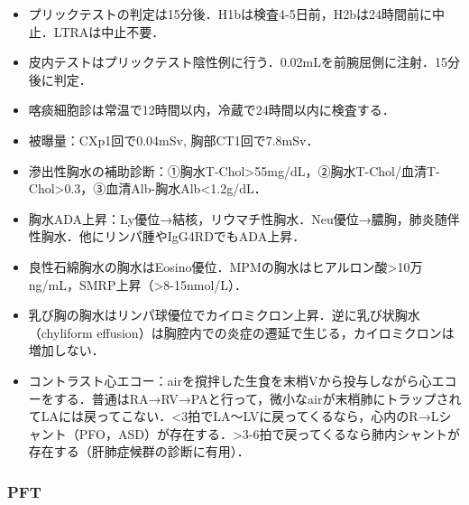 \begin{itemize}
\item プリックテストの判定は15分後．H1bは検査4-5日前，H2bは24時間前に中止．LTRAは中止不要．
\item 皮内テストはプリックテスト陰性例に行う．0.02mLを前腕屈側に注射．15分後に判定．
\item 喀痰細胞診は常温で12時間以内，冷蔵で24時間以内に検査する．
\item 被曝量：CXp1回で0.04mSv, 胸部CT1回で7.8mSv．
\item 滲出性胸水の補助診断：①胸水T-Chol>55mg/dL，②胸水T-Chol/血清T-Chol>0.3，③血清Alb-胸水Alb<1.2g/dL．
\item 胸水ADA上昇：Ly優位→結核，リウマチ性胸水．Neu優位→膿胸，肺炎随伴性胸水．他にリンパ腫やIgG4RDでもADA上昇．
\item 良性石綿胸水の胸水はEosino優位．MPMの胸水はヒアルロン酸>10万ng/mL，SMRP上昇（>8-15nmol/L）．
\item 乳び胸の胸水はリンパ球優位でカイロミクロン上昇．逆に乳び状胸水（chyliform effusion）は胸腔内での炎症の遷延で生じる，カイロミクロンは増加しない．
\item コントラスト心エコー：airを撹拌した生食を末梢Vから投与しながら心エコーをする．普通はRA→RV→PAと行って，微小なairが末梢肺にトラップされてLAには戻ってこない．<3拍でLA〜LVに戻ってくるなら，心内のR→Lシャント（PFO，ASD）が存在する．>3-6拍で戻ってくるなら肺内シャントが存在する（肝肺症候群の診断に有用）．
\end{itemize}


\subsubsection{PFT}

